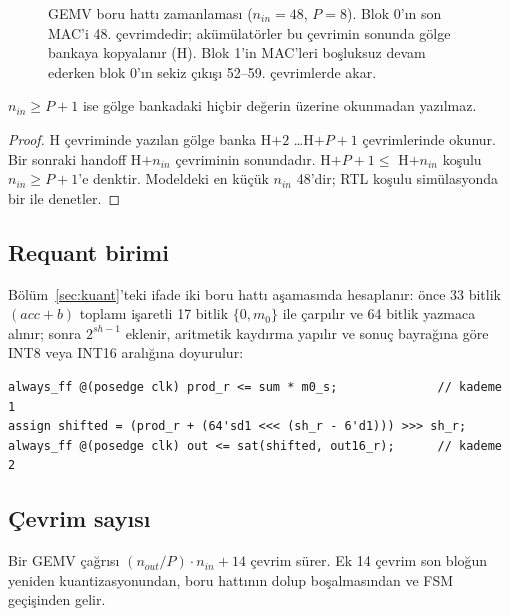 \begin{figure}[h]
  \centering
  \caption[GEMV boru hattı zamanlaması]{GEMV boru hattı zamanlaması ($n_{in}=48$, $P=8$). Blok 0'ın son MAC'i 48. çevrimdedir; akümülatörler bu çevrimin sonunda gölge bankaya kopyalanır (H). Blok 1'in MAC'leri boşluksuz devam ederken blok 0'ın sekiz çıkışı 52--59. çevrimlerde akar.}
  \label{fig:boruhatti}
\end{figure}

\begin{onerme}\label{on:golge}
$n_{in} \ge P+1$ ise gölge bankadaki hiçbir değerin üzerine okunmadan yazılmaz.
\end{onerme}
\begin{proof}
H çevriminde yazılan gölge banka H$+2$ \dots H$+P+1$ çevrimlerinde okunur. Bir sonraki handoff H$+n_{in}$ çevriminin sonundadır. H$+P+1 \le$ H$+n_{in}$ koşulu $n_{in} \ge P+1$'e denktir. Modeldeki en küçük $n_{in}$ 48'dir; RTL koşulu simülasyonda bir  ile denetler.
\end{proof}

\subsection{Requant birimi}
Bölüm~\ref{sec:kuant}'teki ifade iki boru hattı aşamasında hesaplanır: önce 33 bitlik $(acc+b)$ toplamı işaretli 17 bitlik $\{0, m_0\}$ ile çarpılır ve 64 bitlik yazmaca alınır; sonra $2^{sh-1}$ eklenir, aritmetik kaydırma yapılır ve sonuç  bayrağına göre INT8 veya INT16 aralığına doyurulur:

\begin{lstlisting}[language=SV]
always_ff @(posedge clk) prod_r <= sum * m0_s;              // kademe 1
assign shifted = (prod_r + (64'sd1 <<< (sh_r - 6'd1))) >>> sh_r;
always_ff @(posedge clk) out <= sat(shifted, out16_r);      // kademe 2
\end{lstlisting}

\subsection{Çevrim sayısı}
Bir GEMV çağrısı $(n_{out}/P)\cdot n_{in} + 14$ çevrim sürer. Ek 14 çevrim son bloğun yeniden kuantizasyonundan, boru hattının dolup boşalmasından ve FSM geçişinden gelir.

